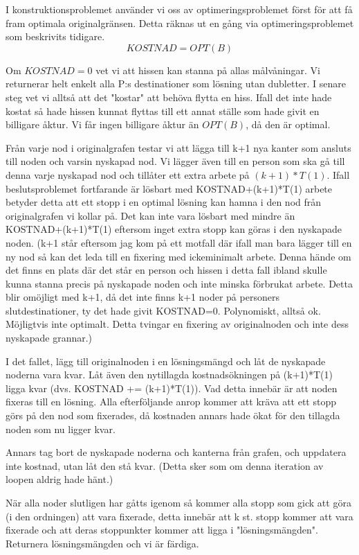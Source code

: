 \documentclass[a4paper,10pt,twoside]{article}
\begin{document}
I konstruktionsproblemet använder vi oss av optimeringsproblemet först för att få fram optimala originalgränsen. Detta räknas ut en gång via optimeringsproblemet som beskrivits tidigare. $$KOSTNAD = OPT(B)$$

Om $KOSTNAD = 0$ vet vi att hissen kan stanna på allas målvåningar. Vi returnerar helt enkelt alla P:s destinationer som lösning utan dubletter. I senare steg vet vi alltså att det "kostar" att behöva flytta en hiss. Ifall det inte hade kostat så hade hissen kunnat flyttas till ett annat ställe som hade givit en billigare åktur. Vi får ingen billigare åktur än $OPT(B)$, då den är optimal.

Från varje nod i originalgrafen testar vi att lägga till k+1 nya kanter som ansluts till noden och varsin nyskapad nod. Vi lägger även till en person som ska gå till denna varje nyskapad nod och tillåter ett extra arbete på $(k+1)*T(1)$. Ifall beslutsproblemet fortfarande är lösbart med KOSTNAD+(k+1)*T(1) arbete betyder detta att ett stopp i en optimal lösning kan hamna i den nod från originalgrafen vi kollar på. Det kan inte vara lösbart med mindre än KOSTNAD+(k+1)*T(1) eftersom inget extra stopp kan göras i den nyskapade noden. (k+1 står eftersom jag kom på ett motfall där ifall man bara lägger till en ny nod så kan det leda till en fixering med ickeminimalt arbete. Denna hände om det finns en plats där det står en person och hissen i detta fall ibland skulle kunna stanna precis på nyskapade noden och inte minska förbrukat arbete. Detta blir omöjligt med k+1, då det inte finns k+1 noder på personers slutdestinationer, ty det hade givit KOSTNAD=0. Polynomiskt, alltså ok. Möjligtvis inte optimalt. Detta tvingar en fixering av originalnoden och inte dess nyskapade grannar.)

I det fallet, lägg till originalnoden i en lösningsmängd och låt de nyskapade noderna vara kvar. Låt även den nytillagda kostnadsökningen på (k+1)*T(1) ligga kvar (dvs. KOSTNAD += (k+1)*T(1)). Vad detta innebär är att noden fixeras till en lösning. Alla efterföljande anrop kommer att kräva att ett stopp görs på den nod som fixerades, då kostnaden annars hade ökat för den tillagda noden som nu ligger kvar.

Annars tag bort de nyskapade noderna och kanterna från grafen, och uppdatera inte kostnad, utan låt den stå kvar. (Detta sker som om denna iteration av loopen aldrig hade hänt.)

När alla noder slutligen har gåtts igenom så kommer alla stopp som gick att göra (i den ordningen) att vara fixerade, detta innebär att k st. stopp kommer att vara fixerade och att deras stoppunkter kommer att ligga i "lösningsmängden". Returnera lösningsmängden och vi är färdiga.
\end{document}
